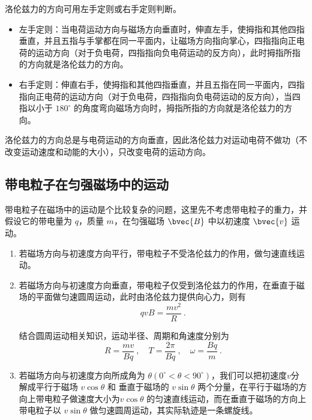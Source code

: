 洛伦兹力的方向可用左手定则或右手定则判断。

\begin{itemize}
\item 左手定则：当电荷运动方向与磁场方向垂直时，伸直左手，使拇指和其他四指垂直，并且五指与手掌都在同一平面内，让磁场方向指向掌心，四指指向正电荷的运动方向（对于负电荷，四指指向负电荷运动的反方向），此时拇指所指的方向就是洛伦兹力的方向。
\item 右手定则：伸直右手，使拇指和其他四指垂直，并且五指在同一平面内，四指指向正电荷的运动方向（对于负电荷，四指指向负电荷运动的反方向），当四指以小于 $180^\circ$ 的角度弯向磁场方向时，拇指所指的方向就是洛伦兹力的方向。
\end{itemize}

洛伦兹力的方向总是与电荷运动的方向垂直，因此洛伦兹力对运动电荷不做功（不改变运动速度和动能的大小），只改变电荷的运动方向。

\subsection{带电粒子在匀强磁场中的运动}


带电粒子在磁场中的运动是个比较复杂的问题，这里先不考虑带电粒子的重力，并假设它的带电量为 $q$，质量 $m$，在匀强磁场 $\bvec{B}$ 中以初速度 $\bvec{v}$ 运动。

\begin{enumerate}
\item 若磁场方向与初速度方向平行，带电粒子不受洛伦兹力的作用，做匀速直线运动。

\item 若磁场方向与初速度方向垂直，带电粒子仅受到洛伦兹力的作用，在垂直于磁场的平面做匀速圆周运动，此时由洛伦兹力提供向心力，则有
\begin{equation}
qvB=\frac{mv^2}{R}~.
\end{equation}



结合圆周运动相关知识，运动半径、周期和角速度分别为
\begin{equation}
R=\frac{mv}{Bq}~, \quad T=\frac{2\pi}{Bq}~, \quad \omega=\frac{Bq}{m}~.
\end{equation}

\item 若磁场方向与初速度方向所成角为 $\theta (0^\circ < \theta < 90^\circ)$，我们可以把初速度$v$分解成平行于磁场 $v \cos \theta$ 和 垂直于磁场的 $v \sin \theta$ 两个分量，在平行于磁场的方向上带电粒子做速度大小为$v \cos \theta$ 的匀速直线运动，而在垂直于磁场的方向上带电粒子以 $v \sin \theta$ 做匀速圆周运动，其实际轨迹是一条螺旋线。
\end{enumerate}
